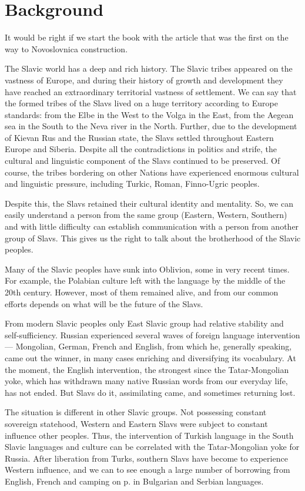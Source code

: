 \chapter{Background}

It would be right if we start the book with the article \cite{intro} that was the first on the way to Novoslovnica construction.

The Slavic world has a deep and rich history. The Slavic tribes appeared on the vastness of Europe, and during their history of growth and development they have reached an extraordinary territorial vastness of settlement. We can say that the formed tribes of the Slavs lived on a huge territory according to Europe standards: from the Elbe in the West to the Volga in the East, from the Aegean sea in the South to the Neva river in the North. Further, due to the development of Kievan Rus and the Russian state, the Slavs settled throughout Eastern Europe and Siberia. Despite all the contradictions in politics and strife, the cultural and linguistic component of the Slavs continued to be preserved. Of course, the tribes bordering on other Nations have experienced enormous cultural and linguistic pressure, including Turkic, Roman, Finno-Ugric peoples.

Despite this, the Slavs retained their cultural identity and mentality. So, we can easily understand a person from the same group (Eastern, Western, Southern) and with little difficulty can establish communication with a person from another group of Slavs. This gives us the right to talk about the brotherhood of the Slavic peoples.

Many of the Slavic peoples have sunk into Oblivion, some in very recent times. For example, the Polabian culture left with the language by the middle of the 20th century. However, most of them remained alive, and from our common efforts depends on what will be the future of the Slavs.

From modern Slavic peoples only East Slavic group had relative stability and self-sufficiency. Russian experienced several waves of foreign language intervention — Mongolian, German, French and English, from which he, generally speaking, came out the winner, in many cases enriching and diversifying its vocabulary. At the moment, the English intervention, the strongest since the Tatar-Mongolian yoke, which has withdrawn many native Russian words from our everyday life, has not ended. But Slavs do it, assimilating came, and sometimes returning lost.

The situation is different in other Slavic groups. Not possessing constant sovereign statehood, Western and Eastern Slavs were subject to constant influence other peoples. Thus, the intervention of Turkish language in the South Slavic languages and culture can be correlated with the Tatar-Mongolian yoke for Russia. After liberation from Turks, southern Slavs have become to experience Western influence, and we can to see enough a large number of borrowing from English, French and camping on p. in Bulgarian and Serbian languages.


